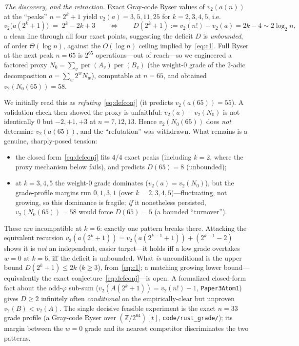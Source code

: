 \documentclass[11pt]{article}
\theoremstyle{remark}\newtheorem{remark}[theorem]{Remark}
\DeclareMathOperator{\perm}{per}
\newcommand{\Z}{\mathbb Z}
\newcommand{\vtwo}{v_2}
\begin{document}
\emph{The discovery, and the retraction.} Exact Gray-code Ryser values of
$\vtwo(a(n))$ at the ``peaks'' $n=2^k+1$ yield $\vtwo(a) = 3,5,11,25$ for
$k=2,3,4,5$, i.e.
\begin{equation}\label{eq:defconj}
   \vtwo\big(a(2^k+1)\big) \;=\; 2^k - 2k + 3
   \qquad\Longleftrightarrow\qquad
   D(2^k+1) := \vtwo(n!) - \vtwo(a) = 2k-4 \sim 2\log_2 n,
\end{equation}
a clean line through all four exact points, suggesting the deficit $D$ is
\emph{unbounded}, of order $\Theta(\log n)$, against the $O(\log n)$ ceiling
implied by~\eqref{eq:c1}. Full Ryser at the next peak $n=65$ is $2^{65}$
operations---out of reach---so we engineered a factored proxy
$N_0=\sum_v \perm(A_v)\perm(B_v)$ (the weight-$0$ grade of the 2-adic
decomposition $a=\sum_w 2^w N_w$), computable at $n=65$, and obtained
$\vtwo(N_0(65))=58$.

We initially read this as \emph{refuting}~\eqref{eq:defconj} (it predicts
$\vtwo(a(65))=55$). A validation check then showed the proxy is unfaithful:
$\vtwo(a)-\vtwo(N_0)$ is not identically $0$ but $-2,+1,+3$ at $n=7,12,13$. Hence
$\vtwo(N_0(65))$ does \emph{not} determine $\vtwo(a(65))$, and the ``refutation''
was withdrawn. What remains is a genuine, sharply-posed tension:
\begin{itemize}
\item the closed form~\eqref{eq:defconj} fits $4/4$ exact peaks (including $k=2$,
      where the proxy mechanism below fails), and predicts $D(65)=8$ (unbounded);
\item at $k=3,4,5$ the weight-$0$ grade dominates ($\vtwo(a)=\vtwo(N_0)$), but the
      grade-profile margins run $0,1,3,1$ (over $k=2,3,4,5$)---fluctuating, not
      growing, so this dominance is fragile; \emph{if} it nonetheless persisted,
      $\vtwo(N_0(65))=58$ would force $D(65)=5$ (a bounded ``turnover'').
\end{itemize}
These are incompatible at $k=6$: exactly one pattern breaks there. Attacking the
equivalent recursion $\vtwo(a(2^k+1))=\vtwo(a(2^{k-1}+1))+(2^{k-1}-2)$ shows it is
\emph{not} an independent, easier target---it holds iff a low grade overtakes
$w=0$ at $k=6$, iff the deficit is unbounded. What \emph{is} unconditional is the
upper bound $D(2^k+1)\le 2k$ ($k\ge3$), from~\eqref{eq:c1}; a matching growing
lower bound---equivalently the exact conjecture~\eqref{eq:defconj}---is open. A
formalized closed-form fact about the odd-$\varphi$ sub-sum
($\vtwo(A(2^k+1))=\vtwo(n!)-1$, \texttt{Paper3Atom1}) gives $D\ge2$ infinitely
often \emph{conditional} on the empirically-clear but unproven
$\vtwo(B)<\vtwo(A)$. The single decisive feasible experiment is the exact
$n=33$ grade profile (a Gray-code Ryser over $(\Z/2^{64})[t]$,
\texttt{code/rust\_grade/}); its margin between the $w=0$ grade and its nearest
competitor discriminates the two patterns.
\end{document}
